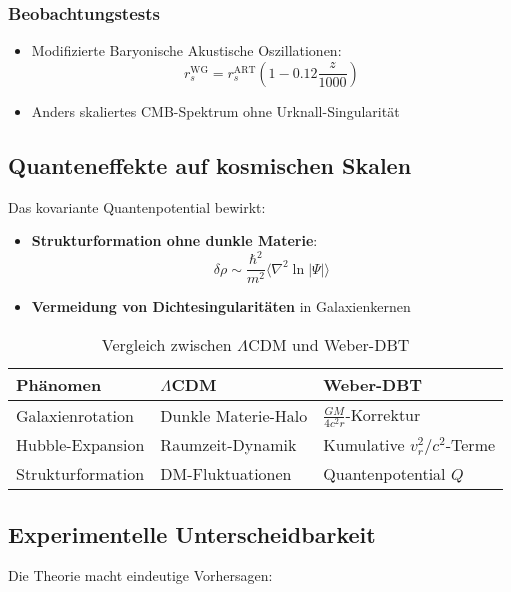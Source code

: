 \subsubsection{Beobachtungstests}
\begin{itemize}
\item Modifizierte Baryonische Akustische Oszillationen:
\begin{equation}
r_s^{\mathrm{WG}} = r_s^{\mathrm{ART}}\left(1 - 0.12\frac{z}{1000}\right)
\end{equation}

\item Anders skaliertes CMB-Spektrum ohne Urknall-Singularität
\end{itemize}

\subsection{Quanteneffekte auf kosmischen Skalen}
Das kovariante Quantenpotential bewirkt:

\begin{itemize}
\item \textbf{Strukturformation ohne dunkle Materie}:
\begin{equation}
\delta\rho \sim \frac{\hbar^2}{m^2}\langle \nabla^2\ln|\Psi|\rangle
\end{equation}

\item \textbf{Vermeidung von Dichtesingularitäten} in Galaxienkernen
\end{itemize}

\begin{table}[h]
\centering
\caption{Vergleich zwischen $\Lambda$CDM und Weber-DBT}
\label{tab:comparison}
\begin{tabular}{lll}
\toprule
\textbf{Phänomen} & \textbf{$\Lambda$CDM} & \textbf{Weber-DBT} \\
\midrule
Galaxienrotation & Dunkle Materie-Halo & $\frac{GM}{4c^2r}$-Korrektur \\
Hubble-Expansion & Raumzeit-Dynamik & Kumulative $v_r^2/c^2$-Terme \\
Strukturformation & DM-Fluktuationen & Quantenpotential $Q$ \\
\bottomrule
\end{tabular}
\end{table}

\subsection{Experimentelle Unterscheidbarkeit}
Die Theorie macht eindeutige Vorhersagen:

